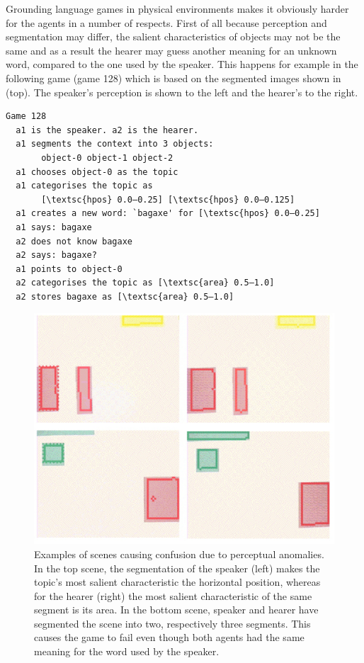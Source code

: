 Grounding language games in physical environments
makes it obviously harder
for the agents in a number of respects. First of 
all because perception and segmentation may differ, 
the salient characteristics of objects may not be the same
and as a result the hearer may guess another meaning for an 
unknown word, compared to 
the one used by the speaker. This happens for
example in the following game (game 128) which is based on 
the segmented images shown in  (top). The
speaker's perception is shown to the left and the 
hearer's to the right. 
\begin{verbatim}
Game 128
  a1 is the speaker. a2 is the hearer. 
  a1 segments the context into 3 objects: 
       object-0 object-1 object-2
  a1 chooses object-0 as the topic 
  a1 categorises the topic as 
       [\textsc{hpos} 0.0–0.25] [\textsc{hpos} 0.0–0.125]
  a1 creates a new word: `bagaxe' for [\textsc{hpos} 0.0–0.25]
  a1 says: bagaxe
  a2 does not know bagaxe
  a2 says: bagaxe?
  a1 points to object-0
  a2 categorises the topic as [\textsc{area} 0.5–1.0]
  a2 stores bagaxe as [\textsc{area} 0.5–1.0]
\end{verbatim}


\begin{figure}
\begin{center}
\includegraphics[width=0.8\columnwidth]{chap7/figs/plate-16.pdf}
\end{center}
\caption{Examples of scenes causing confusion
due to perceptual anomalies. In the top scene, 
the segmentation of the speaker (left) makes the 
topic's most salient characteristic the horizontal
position, whereas for the hearer (right) the most salient
characteristic of the same segment is its area. In the 
bottom scene, speaker and hearer have segmented the 
scene into two, respectively three segments. This 
causes the game to fail even though both agents 
had the same meaning for the word used by the speaker.}
\label{fig:plate-16}
\end{figure}

